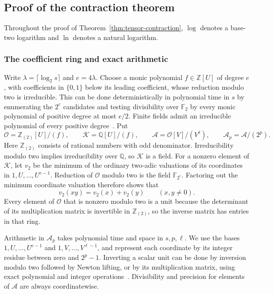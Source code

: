 \subsection{Proof of the contraction theorem}
\label{app:tensor}

Throughout the proof of Theorem~\ref{thm:tensor-contraction},
$\log$ denotes a base-two logarithm and $\ln$ denotes a natural
logarithm.

\subsubsection{The coefficient ring and exact arithmetic}
\label{subsec:tensor-arithmetic}

Write $\lambda=\lceil\log_2 s\rceil$ and $e=4\lambda$.
Choose a monic polynomial $f\in\mathbb Z[U]$ of degree $e$, with
coefficients in $\{0,1\}$ below its leading coefficient, whose reduction
modulo two is irreducible.  This can be done deterministically in
polynomial time in $s$ by enumerating the $2^e$ candidates and testing
divisibility over $\mathbb F_2$ by every monic polynomial of positive
degree at most $e/2$. Finite fields admit an irreducible polynomial of
every positive degree~\cite{vzGG13}.
Put
\[
 \mathcal O=\mathbb Z_{(2)}[U]/(f),\qquad
 \mathcal K=\mathbb Q[U]/(f),\qquad
 \mathcal A=\mathcal O[V]/(V^\ell),\qquad
 \mathcal A_p=\mathcal A/(2^p).
\]
Here $\mathbb Z_{(2)}$ consists of rational numbers with odd
denominator.  Irreducibility modulo two implies irreducibility over
$\mathbb Q$, so $\mathcal K$ is a field.  For a nonzero element of
$\mathcal K$, let $v_2$ be the minimum of the ordinary two-adic
valuations of its coordinates in $1,U,\ldots,U^{e-1}$.
Reduction of $\mathcal O$ modulo two is the field $\mathbb F_{2^e}$.
Factoring out the minimum coordinate valuation therefore shows that
\[
 v_2(xy)=v_2(x)+v_2(y)\qquad(x,y\ne0).
\]
Every element of $\mathcal O$ that is nonzero modulo two is a unit because
the determinant of its multiplication matrix is invertible in
$\mathbb Z_{(2)}$, so the inverse matrix has entries in that ring.

Arithmetic in $\mathcal A_p$ takes polynomial time and space in
$s,p,\ell$.  We use the bases $1,U,\ldots,U^{e-1}$ and
$1,V,\ldots,V^{\ell-1}$, and represent each coordinate by its integer
residue between zero and $2^p-1$.  Inverting a scalar unit can be done
by inversion modulo two followed by Newton lifting, or by its
multiplication matrix, using exact polynomial and integer
operations~\cite{vzGG13}.  Divisibility and precision for
elements of $\mathcal A$ are always coordinatewise.

